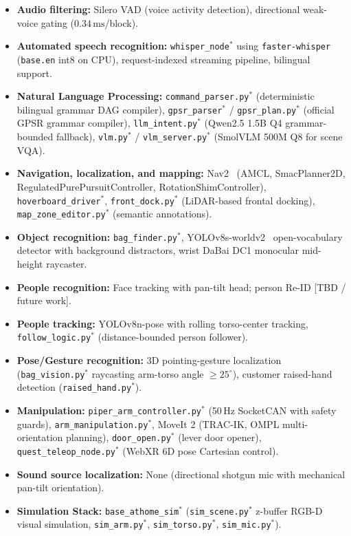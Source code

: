 \begin{itemize}
	\item \textbf{Audio filtering:} Silero VAD (voice activity detection), directional weak-voice gating ($0.34\,\text{ms}$/block).
	\item \textbf{Automated speech recognition:} \texttt{whisper\_node}$^*$ using \texttt{faster-whisper} (\texttt{base.en} int8 on CPU), request-indexed streaming pipeline, bilingual support.
	\item \textbf{Natural Language Processing:} \texttt{command\_parser.py}$^*$ (deterministic bilingual grammar DAG compiler), \texttt{gpsr\_parser}$^*$ / \texttt{gpsr\_plan.py}$^*$ (official GPSR grammar compiler), \texttt{llm\_intent.py}$^*$ (Qwen2.5 1.5B Q4 grammar-bounded fallback), \texttt{vlm.py}$^*$ / \texttt{vlm\_server.py}$^*$ (SmolVLM 500M Q8 for scene VQA).
	\item \textbf{Navigation, localization, and mapping:} Nav2~\cite{macenski2020marathon2} (AMCL, SmacPlanner2D, RegulatedPurePursuitController, RotationShimController), \texttt{hoverboard\_driver}$^*$, \texttt{front\_dock.py}$^*$ (LiDAR-based frontal docking), \texttt{map\_zone\_editor.py}$^*$ (semantic annotations).
	\item \textbf{Object recognition:} \texttt{bag\_finder.py}$^*$, YOLOv8s-worldv2~\cite{cheng2024yoloworld} open-vocabulary detector with background distractors, wrist DaBai DC1 monocular mid-height raycaster.
	\item \textbf{People recognition:} Face tracking with pan-tilt head; person Re-ID [TBD / future work].
	\item \textbf{People tracking:} YOLOv8n-pose with rolling torso-center tracking, \texttt{follow\_logic.py}$^*$ (distance-bounded person follower).
	\item \textbf{Pose/Gesture recognition:} 3D pointing-gesture localization (\texttt{bag\_vision.py}$^*$ raycasting arm-torso angle $\ge 25^\circ$), customer raised-hand detection (\texttt{raised\_hand.py}$^*$).
	\item \textbf{Manipulation:} \texttt{piper\_arm\_controller.py}$^*$ (50\,Hz SocketCAN with safety guards), \texttt{arm\_manipulation.py}$^*$, MoveIt 2 (TRAC-IK, OMPL multi-orientation planning), \texttt{door\_open.py}$^*$ (lever door opener), \texttt{quest\_teleop\_node.py}$^*$ (WebXR 6D pose Cartesian control).
	\item \textbf{Sound source localization:} None (directional shotgun mic with mechanical pan-tilt orientation).
	\item \textbf{Simulation Stack:} \texttt{base\_athome\_sim}$^*$ (\texttt{sim\_scene.py}$^*$ z-buffer RGB-D visual simulation, \texttt{sim\_arm.py}$^*$, \texttt{sim\_torso.py}$^*$, \texttt{sim\_mic.py}$^*$).
\end{itemize}

